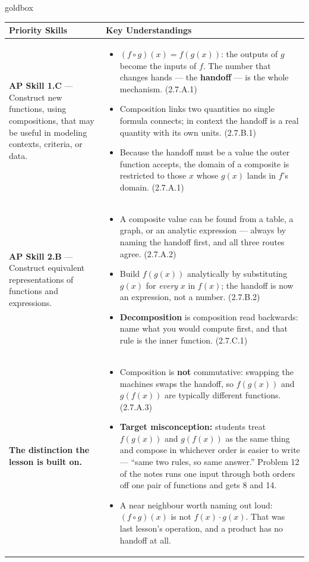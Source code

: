 \documentclass[10pt]{article}
\begin{document}
\renewcommand{\arraystretch}{1.6}
\begin{skillbox}{goldbox}
\begin{tabularx}{\linewidth}{@{}X X@{}}
\textbf{Priority Skills} &
\textbf{Key Understandings} \\
\midrule
\textbf{AP Skill 1.C} --- Construct new functions, using compositions, that may be
useful in modeling contexts, criteria, or data. &
\begin{itemize}[leftmargin=1.2em,itemsep=2pt,topsep=0pt]
  \item $(f \circ g)(x) = f(g(x))$: the outputs of $g$ become the inputs of $f$.
        The number that changes hands --- the \textbf{handoff} --- is the whole
        mechanism. (2.7.A.1)
  \item Composition links two quantities no single formula connects; in context
        the handoff is a real quantity with its own units. (2.7.B.1)
  \item Because the handoff must be a value the outer function accepts, the
        domain of a composite is restricted to those $x$ whose $g(x)$ lands in
        $f$'s domain. (2.7.A.1)
\end{itemize} \\
\textbf{AP Skill 2.B} --- Construct equivalent representations of functions and
expressions. &
\begin{itemize}[leftmargin=1.2em,itemsep=2pt,topsep=0pt]
  \item A composite value can be found from a table, a graph, or an analytic
        expression --- always by naming the handoff first, and all three routes
        agree. (2.7.A.2)
  \item Build $f(g(x))$ analytically by substituting $g(x)$ for \textit{every}
        $x$ in $f(x)$; the handoff is now an expression, not a number. (2.7.B.2)
  \item \textbf{Decomposition} is composition read backwards: name what you
        would compute first, and that rule is the inner function. (2.7.C.1)
\end{itemize} \\
\textbf{The distinction the lesson is built on.} &
\begin{itemize}[leftmargin=1.2em,itemsep=2pt,topsep=0pt]
  \item Composition is \textbf{not} commutative: swapping the machines swaps the
        handoff, so $f(g(x))$ and $g(f(x))$ are typically different functions.
        (2.7.A.3)
  \item \textbf{Target misconception:} students treat $f(g(x))$ and $g(f(x))$ as
        the same thing and compose in whichever order is easier to write ---
        ``same two rules, so same answer.'' Problem 12 of the notes runs one
        input through both orders off one pair of functions and gets 8 and 14.
  \item A near neighbour worth naming out loud: $(f \circ g)(x)$ is not
        $f(x) \cdot g(x)$. That was last lesson's operation, and a product has no
        handoff at all.
\end{itemize} \\
\end{tabularx}
\end{skillbox}
\end{document}
